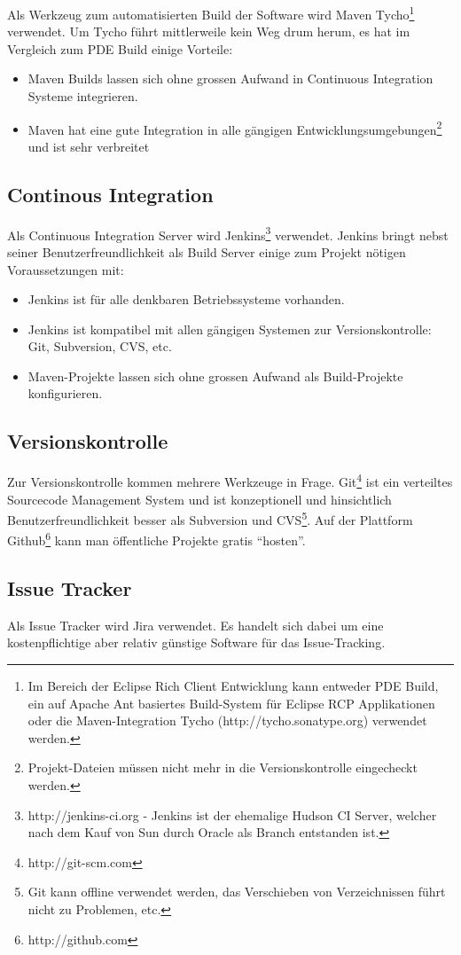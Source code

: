 Als Werkzeug zum automatisierten Build der Software wird Maven Tycho\footnote{Im Bereich der Eclipse Rich Client Entwicklung kann entweder PDE Build, ein auf Apache Ant basiertes Build-System für Eclipse RCP Applikationen\cite{vogelZapfPdeBuild} oder die Maven-Integration Tycho (http://tycho.sonatype.org) verwendet werden.} verwendet. Um Tycho führt mittlerweile kein Weg drum herum, es hat im Vergleich zum PDE Build einige Vorteile:
\begin{itemize}
	\item Maven Builds lassen sich ohne grossen Aufwand in Continuous Integration Systeme integrieren.
	\item Maven hat eine gute Integration in alle gängigen Entwicklungsumgebungen\footnote{Projekt-Dateien müssen nicht mehr in die Versionskontrolle eingecheckt werden.} und ist sehr verbreitet
\end{itemize}

\subsection{Continous Integration}
Als Continuous Integration Server wird Jenkins\footnote{http://jenkins-ci.org - Jenkins ist der ehemalige Hudson CI Server, welcher nach dem Kauf von Sun durch Oracle als Branch entstanden ist.} verwendet. Jenkins bringt nebst seiner Benutzerfreundlichkeit als Build Server einige zum Projekt nötigen Voraussetzungen mit:
\begin{itemize}
	\item Jenkins ist für alle denkbaren Betriebssysteme vorhanden.
	\item Jenkins ist kompatibel mit allen gängigen Systemen zur Versionskontrolle: Git, Subversion, CVS, etc.
	\item Maven-Projekte lassen sich ohne grossen Aufwand als Build-Projekte konfigurieren.
\end{itemize}

\subsection{Versionskontrolle}
Zur Versionskontrolle kommen mehrere Werkzeuge in Frage. Git\footnote{http://git-scm.com} ist ein verteiltes Sourcecode Management System und ist konzeptionell und hinsichtlich Benutzerfreundlichkeit besser als Subversion und CVS\footnote{Git kann offline verwendet werden, das Verschieben von Verzeichnissen führt nicht zu Problemen, etc.}. Auf der Plattform Github\footnote{http://github.com} kann man öffentliche Projekte gratis ``hosten''.

\subsection{Issue Tracker}
Als Issue Tracker wird Jira verwendet. Es handelt sich dabei um eine kostenpflichtige aber relativ günstige Software für das Issue-Tracking.


